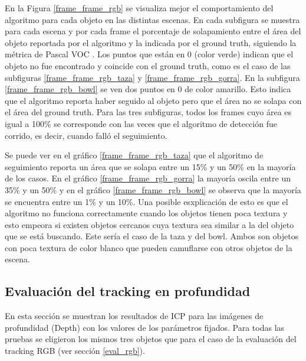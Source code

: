 En la Figura \ref{frame_frame_rgb} se visualiza mejor el comportamiento del algoritmo para cada objeto en las distintas escenas. En cada subfigura se muestra para cada escena y por cada frame el porcentaje de solapamiento entre el área del objeto reportada por el algoritmo y la indicada por el ground truth, siguiendo la métrica de Pascal VOC \cite{everinghampascal}.  Los puntos que están en 0 (color verde) indican que el objeto no fue encontrado y coincide con el ground truth, como es el caso de las subfiguras \ref{frame_frame_rgb_taza} y \ref{frame_frame_rgb_gorra}. En la subfigura \ref{frame_frame_rgb_bowl} se ven dos puntos en 0 de color amarillo. Esto indica que el algoritmo reporta haber seguido al objeto pero que el área no se solapa con el área del ground truth. Para las tres subfiguras, todos los frames cuyo área es igual a 100\% se corresponde con las veces que el algoritmo de detección fue corrido, es decir, cuando falló el seguimiento. 

Se puede ver en el gráfico \ref{frame_frame_rgb_taza} que el algoritmo de seguimiento reporta un área que se solapa entre un 15\% y un 50\% en la mayoría de los casos. En el gráfico \ref{frame_frame_rgb_gorra} la mayoría oscila entre un 35\% y un 50\% y en el gráfico \ref{frame_frame_rgb_bowl} se observa que la mayoría se encuentra entre un 1\% y un 10\%. Una posible esxplicación de esto es que el algoritmo no funciona correctamente cuando los objetos tienen poca textura y esto empeora si existen objetos cercanos cuya textura sea similar a la del objeto que se está buscando. Este sería el caso de la taza y del bowl. Ambos son objetos con poca textura de color blanco que pueden camuflarse con otros objetos de la escena.

\subsection{Evaluación del tracking en profundidad}
En esta sección se muestran los resultados de ICP para las imágenes de profundidad (Depth) con los valores de los parámetros fijados. Para todas las pruebas se eligieron los mismos tres objetos que para el caso de la evaluación del tracking RGB (ver sección \ref{eval_rgb}).

